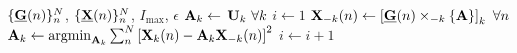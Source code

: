 \begin{algorithmic}[1]
	\Require $\{\ten{G}(n)\}_n^N$, $\{\ten{X}(n)\}_n^N$, $I_\text{max}$, $\epsilon$
	\State $\mat{A}_k \gets $ $\mat{U}_k \ \forall k$
	\State $i\gets 1$
	\Repeat
	\State $\mat{X}_{-k}(n)\gets\left[\ten{G}(n)\mmprsi{\mat{A}}{k}\right]_k \ \forall n$
	\State
	$\mat{A}_k\gets\textstyle{\argmin_{\mat{A}_k}\sum_n^N}\left[\mat{X}_k(n)-\mat{A}_k\mat{X}_{-k}(n)\right]^2$
	\EndFor
	\State $i\gets i+1$
\end{algorithmic}
